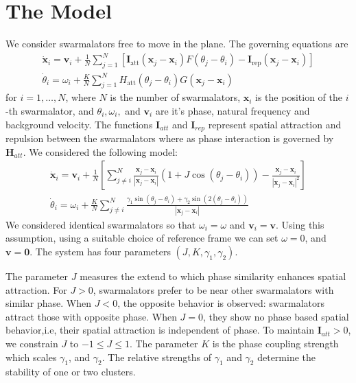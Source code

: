 \documentclass[superscriptaddress,reprint,amssymb, amsmath,aps, pre]{revtex4-1}
\begin{document}
\section{The Model}
{
    We consider swarmalators free to move in the plane. The governing equations are \cite{swarm} 
    \begin{gather}
        \dot{\mathbf{x}}_{i}=\mathbf{v}_{i}+\frac{1}{N} \sum_{j=1}^{N}\left[\mathbf{I}_{\mathrm{att}}\left(\mathbf{x}_{j}-\mathbf{x}_{i}\right) F\left(\theta_{j}   -\theta_{i}\right)-\mathbf{I}_{\mathrm{rep}}\left(\mathbf{x}_{j}-\mathbf{x}_{i}    \right)\right] \\
        \dot{\theta}_{i}=\omega_{i}+\frac{K}{N} \sum_{j=1}^{N} H_{\mathrm{att}}\left(\theta_{j}-\theta_{i}\right) G\left(\mathbf{x}_{j}-\mathbf{x}_{i}\right)
    \end{gather}
    for \(i = 1,\ldots,N\), where \(N\) is the number of swarmalators, $\mathbf{x}_{i} $ is the position of the \(i\)-th swarmalator, and $\theta_i,\omega_i,$ and $\mathbf{v}_i$ are it's phase, natural frequency and background velocity. The functions $\mathbf{I}_  {att}$ and $\mathbf{I}_{rep}$ represent spatial attraction and repulsion between the swarmalators where as phase interaction is governed by $\mathbf{H}_{att}$. We considered the following model:
    \begin{gather} 
        \dot{\mathbf{x}}_{i}=\mathbf{v}_{i}+\frac{1}{N}\left[\sum_{j \neq i}^{N} \frac  {\mathbf{x}_{j}-\mathbf{x}_{i}}{\left|\mathbf{x}_{j}-\mathbf{x}_{i}\right|}\left  (1+J \cos \left(\theta_{j}-\theta_{i}\right)\right)-\frac{\mathbf{x}_{j}-\mathbf{x}_{i}}{\left|\mathbf{x}_{j}-\mathbf{x}_{i}\right|^{2}}\right] \label{eq:space} \\
        \dot{\theta}_{i}=\omega_{i}+\frac{K}{N} \sum_{j \neq i}^{N} \frac{\gamma_1 \sin\left(\theta_{j}-\theta_{i}\right) + \gamma_2 \sin \left(2 \left(\theta_j -\theta_i\right)\right) }{\left|\mathbf{x}_{j}-\mathbf{x}_{i}\right|} \label{eq:phase}
    \end{gather}
    We considered identical swarmalators so that $\omega_i = \omega$ and $\mathbf{v}_i = \mathbf{v}$. Using this assumption, using a suitable choice of reference frame we  can set $\omega = 0$, and $\mathbf{v} = \mathbf{0}$. The system has four parameters $\left(J,K,\gamma_1,\gamma_2\right )$.

    The parameter \(J\) measures the extend to which phase similarity enhances spatial attraction. For $J>0$, swarmalators prefer to be near other swarmalators with  similar phase. When $J<0$, the opposite behavior is observed: swarmalators attract those with opposite phase. When $J=0$, they show no phase based spatial behavior,i.e, their spatial attraction is independent of phase. To maintain $\mathbf{I}_{att}> 0$, we constrain $J$ to $-1 \leq J \leq 1$. The parameter $K$ is the phase coupling strength which scales $\gamma_1$, and $\gamma_2$. The relative  strengths of $\gamma_1$ and $\gamma_2$ determine the stability of one or two clusters. 
    
}
\end{document}
